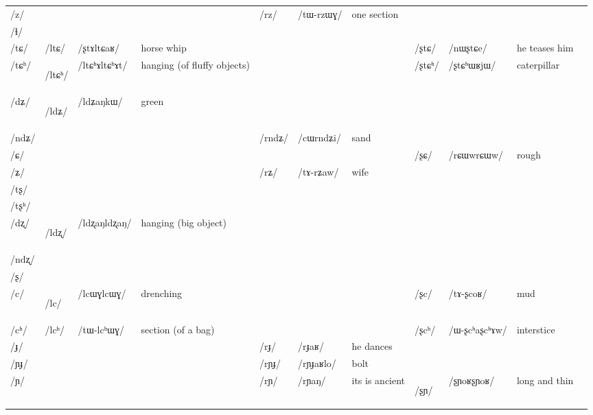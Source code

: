 \documentclass[oneside,a4paper,11pt]{article}
\newcommand{\ipa}[1]{\mbox{\phon/#1/}}
\newcommand{\deux}[1]{\ipa{#1}\addtocounter{2clusters}{1}}
\newcommand{\tib}[1]{\cellcolor{lightgray}\textbf{#1}}
\newcommand{\idph}[1]{\cellcolor{gray}\textbf{#1}}
\begin{document}
\begin{landscape}
\begin{table}
{\begin{tabular}{l|lll|lll|lll|l}
\ipa{z}  & 	  & 	  & 	  & 	 \deux{rz}  & 	 \ipa{tɯ-rzɯɣ}  & 	 one section & 	 & 	 & 	 & 	\\	
\ipa{ɬ}  & 	  & 	  & 	  & 	  & 	  & 	  & 	 & 	 & 	 & 	\\	
\ipa{tɕ}  & 	 \deux{ltɕ}  & 	 \ipa{ʂtɤltɕaʁ}  & 	 horse whip  & 	 & 	 & 	 & 	 \deux{ʂtɕ}  & 	 \ipa{nɯʂtɕe}  & 	he teases him  & 	\\	
\ipa{tɕʰ}  & 	 \deux{ltɕʰ} \idph{}  & 	 \ipa{ltɕʰɤltɕʰɤt}  & 	hanging (of fluffy objects)  & 	 & 	 & 	 & 	 \deux{ʂtɕʰ}  & 	 \ipa{ʂtɕʰɯʁjɯ}  & 	caterpillar  & 	\\	
\ipa{dʑ}  & 	 \deux{ldʑ} \tib{}  & 	 \ipa{ldʑaŋkɯ}  & 	 green & 	  & 	  & 	  & 	 & 	 & 	 & 	\\	
\ipa{ndʑ}  & 	  & 	  & 	  & 	 \deux{rndʑ}  & 	 \ipa{cɯrndʑi}  & 	sand  & 	 & 	 & 	 & 	\\	
\ipa{ɕ}  & 	  & 	  & 	  & 	 & 	 & 	 & 	 \deux{ʂɕ}  & 	 \ipa{rɕɯwrɕɯw}  & 	rough & 	\\	
\ipa{ʑ}  & 	  & 	  & 	  & 	 \deux{rʑ}  & 	 \ipa{tɤ-rʑaw}  & 	wife  & 	 & 	 & 	 & 	\\	
\ipa{tʂ}  & 	  & 	  & 	  & 	  & 	  & 	  & 	 & 	 & 	 & 	\\	
\ipa{tʂʰ}  & 	  & 	  & 	  & 	  & 	  & 	  & 	 & 	 & 	 & 	\\	
\ipa{dʐ}  & 	 \deux{ldʐ} \idph{}  & 	 \ipa{ldʐaŋldʐaŋ}  & 	 hanging (big object) & 	  & 	  & 	  & 	 & 	 & 	 & 	\\	
\ipa{ndʐ}  & 	  & 	  & 	  & 	  & 	  & 	  & 	 & 	 & 	 & 	\\	
\ipa{ʂ}  & 	  & 	  & 	  & 	  & 	  & 	  & 	 & 	 & 	 & 	\\	
\ipa{c}  & 	 \deux{lc} \idph{} & 	 \ipa{lcɯɣlcɯɣ}  & 	 drenching & 	 & 	 & 	 & 	 \deux{ʂc}  & 	 \ipa{tɤ-ʂcoʁ}  & 	 mud & 	\\	
\ipa{cʰ}  & 	 \deux{lcʰ}  & 	 \ipa{tɯ-lcʰɯɣ}  & 	 section (of a bag) & 	 & 	 & 	 & 	 \deux{ʂcʰ}  & 	 \ipa{ɯ-ʂcʰaʂcʰɤw}  & 	 interstice & 	\\	
\ipa{ɟ}  & 	  & 	  & 	  & 	 \deux{rɟ}  & 	 \ipa{rɟaʁ}  & 	he dances  & 	 & 	 & 	 & 	\\	
\ipa{ɲɟ}  & 	  & 	  & 	  & 	 \deux{rɲɟ}  & 	 \ipa{rɲɟaʁlo}  & 	 bolt & 	 & 	 & 	 & 	\\	
\ipa{ɲ}  & 	  & 	  & 	  & 	 \deux{rɲ}  & 	 \ipa{rɲaŋ}  & 	 its is ancient & 	 \deux{ʂɲ} \idph{}  & 	\ipa{ʂɲoʁʂɲoʁ} & 	long and thin & 	\\	
\midrule							
\end{tabular}}
\end{table}
 \begin{table}

\end{table}
\end{landscape}
\end{document}
